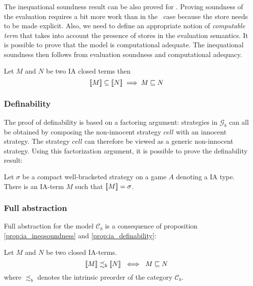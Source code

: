 The inequational soundness result can be also proved for \ialgol.
Proving soundness of the evaluation requires a bit more work than in
the \pcf\ case because the store needs to be made explicit. Also, we
need to define an appropriate notion of \emph{computable term} that
takes into account the presence of stores in the evaluation
semantics. It is possible to prove that the model is computational
adequate. The inequational soundness then follows from evaluation
soundness and computational adequacy.


\begin{prop}
\label{prop:ia_ineqsoundness} Let $M$ and $N$ be two IA closed terms then
$${[\![ M ]\!]} \subseteq {[\![N ]\!]} \implies  M \sqsubseteq N $$
\end{prop}

\subsubsection{Definability}

The proof of definability is based on a factoring argument: strategies in
$\mathcal{G}_b$ can all be obtained by composing the non-innocent strategy $cell$ with an innocent strategy.
The strategy $cell$ can therefore be viewed as a generic non-innocent strategy. Using this factorization argument,
it is possible to prove the definability result:
\begin{prop}[Definability]
\label{prop:ia_definability} Let $\sigma$ be a compact well-bracketed
strategy on a game $A$ denoting a IA type. There is an IA-term $M$ such
that ${[\![ M ]\!]} = \sigma$.
\end{prop}

\subsubsection{Full abstraction}

Full abstraction for the model $\mathcal{C}_b$ is a consequence of proposition
\ref{prop:ia_ineqsoundness} and \ref{prop:ia_definability}:
\begin{thm}
Let $M$ and $N$ be two closed IA-terms.
$${[\![ M ]\!]} \precsim_b {[\![ N ]\!]} \ \iff \ M \sqsubseteq N$$
where $\precsim_b$ denotes the intrinsic preorder of the category
$\mathcal{C}_b$.
\end{thm}


